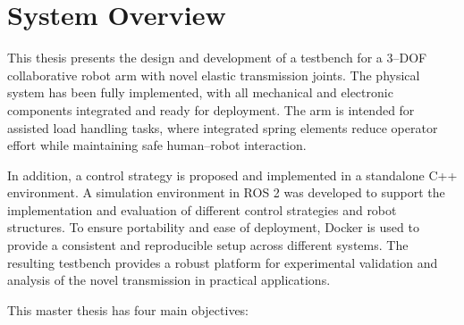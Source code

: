 \documentclass[11pt,a4paper,twoside,openright]{book}
\begin{document}
\section{System Overview}

This thesis presents the design and development of a testbench for a 3--DOF collaborative robot arm with novel elastic transmission joints. The physical system has been fully implemented, with all mechanical and electronic components integrated and ready for deployment. The arm is intended for assisted load handling tasks, where integrated spring elements reduce operator effort while maintaining safe human--robot interaction.

In addition, a control strategy is proposed and implemented in a standalone C++ environment. A simulation environment in ROS 2 was developed to support the implementation and evaluation of different control strategies and robot structures. To ensure portability and ease of deployment, Docker is used to provide a consistent and reproducible setup across different systems. The resulting testbench provides a robust platform for experimental validation and analysis of the novel transmission in practical applications.

This master thesis has four main objectives:
\end{document}
